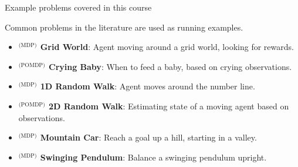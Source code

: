 
\begin{frame}[fragile]{Example problems covered in this course}

Common problems in the literature are used as running examples.


{\footnotesize
\begin{itemize}
    \item \textbf{$^\text{(MDP)}$ Grid World}: Agent moving around a grid world, looking for rewards.
    \item \textbf{$^\text{(POMDP)}$ Crying Baby}: When to feed a baby, based on crying observations.
    \item \textbf{$^\text{(MDP)}$ 1D Random Walk}: Agent moves around the number line.
    \item \textbf{$^\text{(POMDP)}$ 2D Random Walk}: Estimating state of a moving agent based on observations.
    \item \textbf{$^\text{(MDP)}$ Mountain Car}: Reach a goal up a hill, starting in a valley.
    \item \textbf{$^\text{(MDP)}$ Swinging Pendulum}: Balance a swinging pendulum upright.
\end{itemize}
}


\end{frame}
